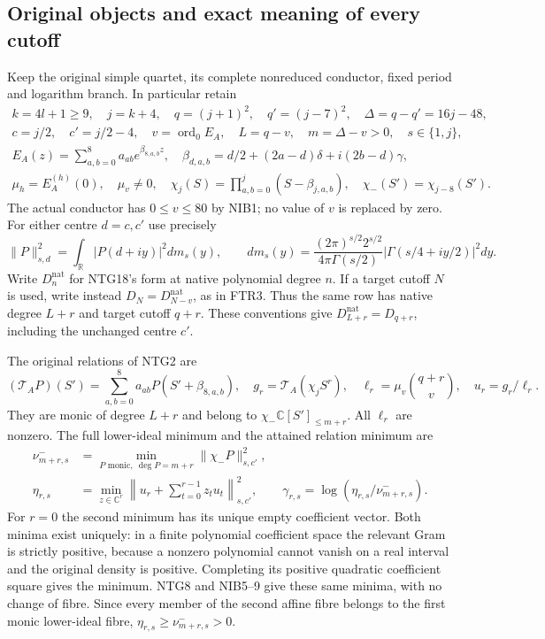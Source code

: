 \subsection{Original objects and exact meaning of every cutoff}
Keep the original simple quartet, its complete nonreduced conductor,
fixed period and logarithm branch.  In particular retain
\[
\begin{gathered}
 k=4l+1\ge9,\quad j=k+4,\quad q=(j+1)^2,\quad q'=(j-7)^2,
 \quad \Delta=q-q'=16j-48,\\
 c=j/2,\quad c'=j/2-4,\quad
 v=\operatorname{ord}_0E_A,\quad L=q-v,\quad m=\Delta-v>0,
 \quad s\in\{1,j\},\\
 E_A(z)=\sum_{a,b=0}^8a_{ab}e^{\beta_{8,a,b}z},\quad
 \beta_{d,a,b}=d/2+(2a-d)\delta+i(2b-d)\gamma,\\
 \mu_h=E_A^{(h)}(0),\quad \mu_v\ne0,\quad
 \chi_j(S)=\prod_{a,b=0}^j(S-\beta_{j,a,b}),\quad
 \chi_-(S')=\chi_{j-8}(S').
\end{gathered}\tag{ATA1}
\]
The actual conductor has $0\le v\le80$ by NIB1; no value of $v$
is replaced by zero.  For either centre $d=c,c'$ use precisely
\[
 \|P\|_{s,d}^2=\int_{\mathbb R}|P(d+iy)|^2dm_s(y),\qquad
 dm_s(y)=\frac{(2\pi)^{s/2}2^{s/2}}{4\pi\Gamma(s/2)}
             |\Gamma(s/4+iy/2)|^2dy.                 \tag{ATA2}
\]
Write $D^{\mathrm{nat}}_n$ for NTG18's form at native polynomial
degree $n$.  If a target cutoff $N$ is used, write instead
$D_N=D^{\mathrm{nat}}_{N-v}$, as in FTR3.  Thus the same row has
native degree $L+r$ and target cutoff $q+r$.  These conventions give
$D^{\mathrm{nat}}_{L+r}=D_{q+r}$, including the unchanged centre $c'$.

The original relations of NTG2 are
\[
 (\mathcal T_AP)(S')=\sum_{a,b=0}^8a_{ab}P(S'+\beta_{8,a,b}),
 \quad g_r=\mathcal T_A(\chi_jS^r),\quad
 \ell_r=\mu_v\binom{q+r}{v},\quad u_r=g_r/\ell_r.       \tag{ATA3}
\]
They are monic of degree $L+r$ and belong to
$\chi_-\mathbb C[S']_{\le m+r}$.  All $\ell_r$ are nonzero.
The full lower-ideal minimum and the attained relation minimum are
\[
\begin{aligned}
 \nu^-_{m+r,s}
 &=\min_{P\text{ monic},\ \deg P=m+r}\|\chi_-P\|_{s,c'}^2,\\
 \eta_{r,s}
 &=\min_{z\in\mathbb C^r}
       \left\|u_r+\sum_{t=0}^{r-1}z_tu_t\right\|_{s,c'}^2,
 \qquad \gamma_{r,s}=\log(\eta_{r,s}/\nu^-_{m+r,s}).
\end{aligned}\tag{ATA4}
\]
For $r=0$ the second minimum has its unique empty coefficient vector.
Both minima exist uniquely: in a finite polynomial coefficient space
the relevant Gram is strictly positive, because a nonzero polynomial
cannot vanish on a real interval and the original density is positive.
Completing its positive quadratic coefficient square gives the minimum.
NTG8 and NIB5--9 give these same minima, with no change of fibre.
Since every member of the second affine fibre belongs to the first
monic lower-ideal fibre, $\eta_{r,s}\ge\nu^-_{m+r,s}>0$.

